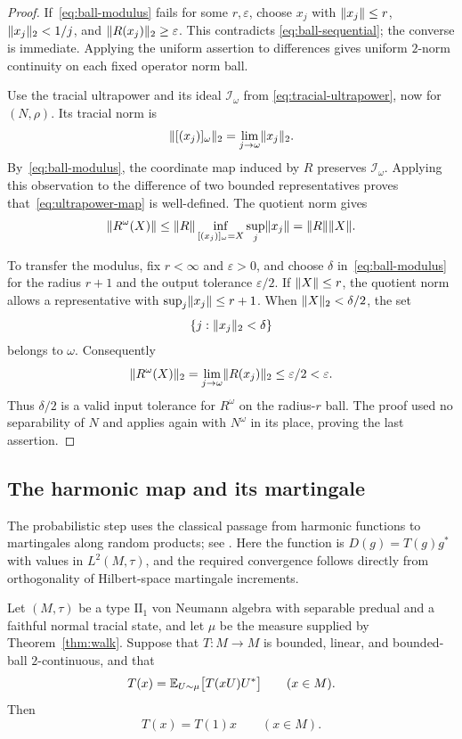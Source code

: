 \begin{proof}
If~\eqref{eq:ball-modulus} fails for some $r,\varepsilon$, choose
$x_j$ with $\lVert x_j\rVert\le r$, $\lVert x_j\rVert_2<1/j$, and
$\lVert R(x_j)\rVert_2\ge\varepsilon$.  This contradicts
\eqref{eq:ball-sequential}; the converse is immediate.  Applying the
uniform assertion to differences gives uniform $2$-norm continuity on
each fixed operator norm ball.

Use the tracial ultrapower and its ideal $\mathcal I_\omega$ from
\eqref{eq:tracial-ultrapower}, now for $(N,\rho)$.  Its tracial norm is
\[
 \lVert[(x_j)]_\omega\rVert_2=\lim_{j\to\omega}\lVert x_j\rVert_2.
\]
By~\eqref{eq:ball-modulus}, the coordinate map induced by $R$ preserves
$\mathcal I_\omega$.  Applying this observation to the difference of two
bounded representatives proves that~\eqref{eq:ultrapower-map} is
well-defined.  The quotient norm gives
\[
 \lVert R^\omega(X)\rVert
 \le \lVert R\rVert\inf_{[(x_j)]_\omega=X}\sup_j\lVert x_j\rVert
 =\lVert R\rVert\lVert X\rVert.
\]

To transfer the modulus, fix $r<\infty$ and $\varepsilon>0$, and choose
$\delta$ in~\eqref{eq:ball-modulus} for the radius $r+1$ and the output
tolerance $\varepsilon/2$.  If $\lVert X\rVert\le r$, the quotient norm
allows a representative with $\sup_j\lVert x_j\rVert\le r+1$.  When
$\lVert X\rVert_2<\delta/2$, the set
\[
 \{j:\lVert x_j\rVert_2<\delta\}
\]
belongs to $\omega$.  Consequently
\[
 \lVert R^\omega(X)\rVert_2
 =\lim_{j\to\omega}\lVert R(x_j)\rVert_2
 \le\varepsilon/2<\varepsilon.
\]
Thus $\delta/2$ is a valid input tolerance for $R^\omega$ on the
radius-$r$ ball.  The proof used no separability of $N$ and applies again
with $N^\omega$ in its place, proving the last assertion.
\end{proof}

\subsection{The harmonic map and its martingale}

The probabilistic step uses the classical passage from harmonic
functions to martingales along random products; see
\cite[p.~415]{Furstenberg1963}. Here the function is
$D(g)=T(g)g^*$ with values in $L^2(M,\tau)$, and the required
convergence follows directly from orthogonality of Hilbert-space
martingale increments.

\begin{theorem}\label{thm:liouville}
Let $(M,\tau)$ be a type $\mathrm{II}_1$ von Neumann algebra with
separable predual and a faithful normal tracial state, and let $\mu$ be
the measure supplied by Theorem~\ref{thm:walk}.  Suppose that
$T:M\to M$ is bounded, linear, and bounded-ball $2$-continuous, and that
\begin{equation}\label{eq:harmonic-map}
 T(x)=\mathbb E_{U\sim\mu}\bigl[T(xU)U^*\bigr]
 \qquad(x\in M).
\end{equation}
Then
\begin{equation}\label{eq:liouville-conclusion}
 T(x)=T(1)x\qquad(x\in M).
\end{equation}
\end{theorem}

